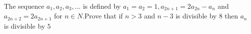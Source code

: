 The sequence $a_1,a_2,a_3,...$ is defined by $a_1=a_2=1,a_{2n+1}=2a_{2n}-a_n$ and $a_{2n+2}=2a_{2n+1}$ for $n\in{N}.$Prove that if $n>3$ and $n-3$ is divisible by $8$ then $a_n$ is divisible by $5$
